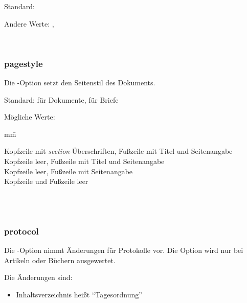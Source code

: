 Standard: 

Andere Werte: , 

\begin{nutzung}
		\>\\
	\beispiel
		\>
\end{nutzung}



\subsubsection{pagestyle}

Die -Option setzt den Seitenstil des Dokuments.

Standard:  für Dokumente,  für Briefe

Mögliche Werte:
\begin{tabbing}
	mm\=\kill

	\>Kopfzeile mit \emph{section}-Überschriften, Fußzeile mit Titel und Seitenangabe\\
	\>Kopfzeile leer, Fußzeile mit Titel und Seitenangabe\\
	\>Kopfzeile leer, Fußzeile mit Seitenangabe\\
	\>Kopfzeile und Fußzeile leer\\
\end{tabbing}

\begin{nutzung}
		\>\\
	\beispiel
		\>\\
		\>
\end{nutzung}

\subsubsection{protocol}

Die -Option nimmt Änderungen für Protokolle vor.
Die Option wird nur bei Artikeln oder Büchern ausgewertet.

Die Änderungen sind:
\begin{itemize}
	\item Inhaltsverzeichnis heißt "`Tagesordnung"'
\end{itemize}

